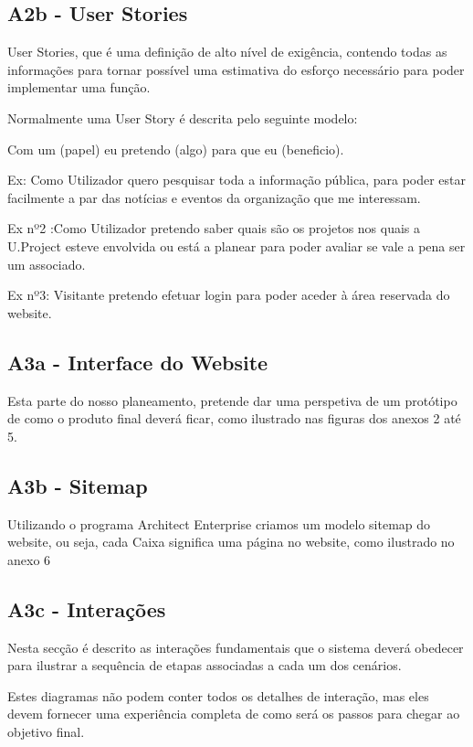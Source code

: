 \documentclass[11pt]{report}
\begin{document}
\subsection{A2b - User Stories}
	User Stories, que é uma definição de alto nível de exigência, contendo todas as informações para tornar possível uma estimativa do esforço necessário para poder implementar uma função. 
	
	Normalmente uma User Story é descrita pelo seguinte modelo: 
	
Com um (papel) eu pretendo (algo) para que eu (beneficio).

Ex: Como Utilizador quero pesquisar toda a informação pública, para poder estar facilmente a par das notícias e eventos da organização que me interessam.

Ex nº2 :Como Utilizador pretendo saber quais são os projetos nos quais a U.Project esteve envolvida ou está a planear para poder avaliar se vale a pena ser um associado.

Ex nº3: Visitante pretendo efetuar login para poder aceder à área reservada do website.

\subsection{A3a - Interface do Website}
Esta parte do nosso planeamento, pretende dar uma perspetiva de um protótipo de como o produto final deverá ficar, como ilustrado nas figuras dos anexos 2 até 5.

\subsection{A3b - Sitemap}
	
Utilizando o programa Architect Enterprise criamos um modelo sitemap do website, ou seja, cada Caixa significa uma página no website, como ilustrado no anexo 6

\subsection{A3c - Interações}
	
Nesta secção é descrito as interações fundamentais que o sistema deverá obedecer para ilustrar a sequência de etapas associadas a cada um dos cenários.

Estes diagramas não podem conter todos os detalhes de interação, mas eles devem fornecer uma experiência completa de como será os passos para chegar ao objetivo final.
\end{document}

